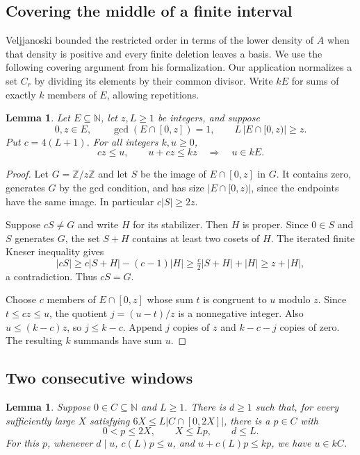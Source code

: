 \documentclass[11pt,reqno]{amsart}
\newtheorem{lemma}[theorem]{Lemma}
\theoremstyle{definition}
\theoremstyle{remark}
\begin{document}
\subsection{Covering the middle of a finite interval}

Veljjanoski \cite{Vel26} bounded the restricted order in terms of the
lower density of \(A\) when that density is positive and every finite
deletion leaves a basis. We use the following covering argument from his
formalization. Our application normalizes a set \(C_r\) by dividing its
elements by their common divisor. Write \(kE\) for sums of exactly \(k\)
members of \(E\), allowing repetitions.

\begin{lemma}\label{lem:normalized-cover}
Let \(E\subseteq\mathbb N\), let \(z,L\ge1\) be integers, and suppose
\[
  0,z\in E,\qquad \gcd(E\cap[0,z])=1,\qquad
  L\,|E\cap[0,z)|\ge z.
\]
Put \(c=4(L+1)\). For all integers \(k,u\ge0\),
\[
  cz\le u,\qquad u+cz\le kz \quad\Longrightarrow\quad u\in kE.
\]
\end{lemma}

\begin{proof}
Let \(G=\mathbb Z/z\mathbb Z\) and let \(S\) be the image of
\(E\cap[0,z]\) in \(G\). It contains zero, generates \(G\) by the gcd
condition, and has size \(|E\cap[0,z)|\), since the endpoints have the
same image. In particular \(c|S|\ge2z\).

Suppose \(cS\ne G\) and write \(H\) for its stabilizer. Then \(H\)
is proper. Since \(0\in S\) and \(S\) generates \(G\), the set
\(S+H\) contains at least two cosets of \(H\). The iterated finite
Kneser inequality gives
\[
 |cS|\ge c|S+H|-(c-1)|H|
       \ge \tfrac c2|S+H|+|H|
       \ge z+|H|,
\]
a contradiction. Thus \(cS=G\).

Choose \(c\) members of \(E\cap[0,z]\) whose sum \(t\) is congruent
to \(u\) modulo \(z\). Since \(t\le cz\le u\), the quotient
\(j=(u-t)/z\) is a nonnegative integer. Also \(u\le(k-c)z\), so
\(j\le k-c\). Append \(j\) copies of \(z\) and \(k-c-j\) copies
of zero. The resulting \(k\) summands have sum \(u\).
\end{proof}

\subsection{Two consecutive windows}

\begin{lemma}\label{lem:productive-cover}
Suppose \(0\in C\subseteq\mathbb N\) and \(L\ge1\). There is \(d\ge1\)
such that, for every sufficiently large \(X\) satisfying
\(6X\le L|C\cap[0,2X]|\), there is a \(p\in C\) with
\[
  0<p\le2X,\qquad X\le Lp,\qquad d\le L.
\]
For this \(p\), whenever \(d\mid u\), \(c(L)p\le u\), and
\(u+c(L)p\le kp\), we have \(u\in kC\).
\end{lemma}
\end{document}
